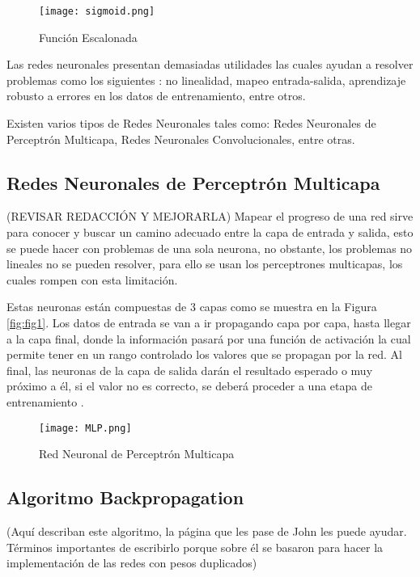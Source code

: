                 \begin{figure}[H]
                    \centering
                    \texttt{[image: sigmoid.png]}
                    \caption{Funci\'on Escalonada}
                    \label{fig:fig5}
                \end{figure}
        Las redes neuronales presentan demasiadas utilidades las cuales ayudan a  resolver problemas como los 
        siguientes \cite{liu2015}: no linealidad, mapeo entrada-salida, aprendizaje robusto 
        a errores en los datos de entrenamiento, entre otros.

        Existen varios tipos de Redes Neuronales tales como: Redes Neuronales de Perceptr\'on 
        Multicapa, Redes Neuronales Convolucionales, entre otras.
    
        \subsection{Redes Neuronales de Perceptr\'on Multicapa}

(REVISAR REDACCIÓN Y MEJORARLA)
            Mapear el progreso de una red sirve para conocer y buscar un camino adecuado entre la capa de entrada y salida, esto se puede hacer 
            con problemas de una sola neurona, no obstante, los problemas no lineales no se pueden resolver, para ello se usan los perceptrones
            multicapas, los cuales rompen con esta limitaci\'on.

            Estas neuronas est\'an compuestas de 3 capas como se muestra en la Figura \ref{fig:fig1}.
            Los datos de entrada se van a ir propagando capa por capa, hasta llegar a la capa final, donde la información pasará
            por una funci\'on de activaci\'on la cual permite tener en un rango controlado los valores que se propagan por la red. Al final, las neuronas de la capa de salida darán el resultado esperado o muy próximo a él, si el valor no es correcto, se deberá proceder a una etapa de entrenamiento \cite{liu2015}.

            \begin{figure}[H]
                \centering
                \texttt{[image: MLP.png]}
                \caption{Red Neuronal de Perceptr\'on Multicapa \cite{liu2015}}
                \label{fig:fig6}
            \end{figure}


\subsection{Algoritmo Backpropagation}
(Aquí describan este algoritmo, la página que les pase de John les puede ayudar. Términos importantes de escribirlo porque sobre él se basaron para hacer la implementación de las redes con pesos duplicados)


